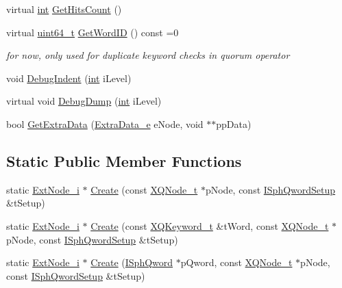 \begin{DoxyCompactItemize}
\item 
virtual \hyperlink{sphinxexpr_8cpp_a4a26e8f9cb8b736e0c4cbf4d16de985e}{int} \hyperlink{classExtNode__i_a74401788106fe32469e0423037cd40b0}{Get\-Hits\-Count} ()
\item 
virtual \hyperlink{sphinxstd_8h_aaa5d1cd013383c889537491c3cfd9aad}{uint64\-\_\-t} \hyperlink{classExtNode__i_ac05a844939491a1875fb8dbf84ba9f97}{Get\-Word\-I\-D} () const =0
\begin{DoxyCompactList}\small\item\em for now, only used for duplicate keyword checks in quorum operator \end{DoxyCompactList}\item 
void \hyperlink{classExtNode__i_a220be7ef4c5586c5d101e049d910f80e}{Debug\-Indent} (\hyperlink{sphinxexpr_8cpp_a4a26e8f9cb8b736e0c4cbf4d16de985e}{int} i\-Level)
\item 
virtual void \hyperlink{classExtNode__i_ae4d6eb460c5415739a01f01195314e65}{Debug\-Dump} (\hyperlink{sphinxexpr_8cpp_a4a26e8f9cb8b736e0c4cbf4d16de985e}{int} i\-Level)
\item 
bool \hyperlink{classExtNode__i_a2375a3444ca76fa86216ea986e6e8720}{Get\-Extra\-Data} (\hyperlink{sphinxint_8h_ad3985aadf484a2191d9758968e2dfa88}{Extra\-Data\-\_\-e} e\-Node, void $\ast$$\ast$pp\-Data)
\end{DoxyCompactItemize}
\subsection*{Static Public Member Functions}
\begin{DoxyCompactItemize}
\item 
static \hyperlink{classExtNode__i}{Ext\-Node\-\_\-i} $\ast$ \hyperlink{classExtNode__i_ae499d76878a56f298677eab48dba8028}{Create} (const \hyperlink{structXQNode__t}{X\-Q\-Node\-\_\-t} $\ast$p\-Node, const \hyperlink{classISphQwordSetup}{I\-Sph\-Qword\-Setup} \&t\-Setup)
\item 
static \hyperlink{classExtNode__i}{Ext\-Node\-\_\-i} $\ast$ \hyperlink{classExtNode__i_acd0bcb0a72025dafed0d10c4515b3b95}{Create} (const \hyperlink{structXQKeyword__t}{X\-Q\-Keyword\-\_\-t} \&t\-Word, const \hyperlink{structXQNode__t}{X\-Q\-Node\-\_\-t} $\ast$p\-Node, const \hyperlink{classISphQwordSetup}{I\-Sph\-Qword\-Setup} \&t\-Setup)
\item 
static \hyperlink{classExtNode__i}{Ext\-Node\-\_\-i} $\ast$ \hyperlink{classExtNode__i_a79dd5d72df0bac15ac674e02e74e4f10}{Create} (\hyperlink{classISphQword}{I\-Sph\-Qword} $\ast$p\-Qword, const \hyperlink{structXQNode__t}{X\-Q\-Node\-\_\-t} $\ast$p\-Node, const \hyperlink{classISphQwordSetup}{I\-Sph\-Qword\-Setup} \&t\-Setup)
\end{DoxyCompactItemize}
